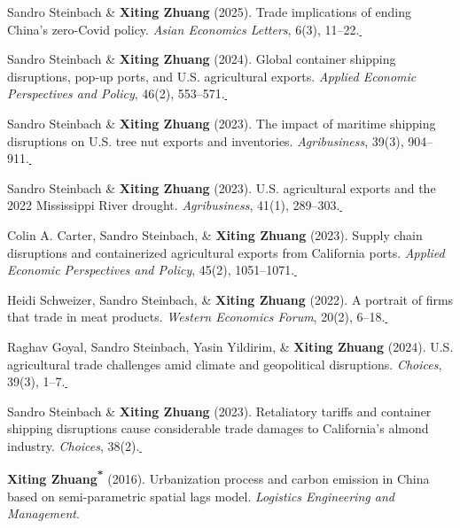 \documentclass[10.5pt,letterpaper]{article}
\newcommand{\corrauthor}{\textsuperscript{*}}
\newcommand{\paperlink}[1]{\href{#1}{\,\small\faExternalLink}}
\renewenvironment{itemize}{
	\begin{list}{}{
			\setlength{\leftmargin}{1.5em}
		}
	}{
	\end{list}
}
\begin{document}
\begin{itemize}
		\item[-] Sandro Steinbach \& \textbf{Xiting Zhuang} (2025). Trade implications of ending China's zero-Covid policy. \textit{Asian Economics Letters}, 6(3), 11--22.\paperlink{https://doi.org/10.46557/001c.137226}
		
		\item[-] Sandro Steinbach \& \textbf{Xiting Zhuang} (2024). Global container shipping disruptions, pop-up ports, and U.S. agricultural exports. \textit{Applied Economic Perspectives and Policy}, 46(2), 553--571.\paperlink{https://doi.org/10.1002/aepp.13399}
		
		\item[-] Sandro Steinbach \& \textbf{Xiting Zhuang} (2023). The impact of maritime shipping disruptions on U.S. tree nut exports and inventories. \textit{Agribusiness}, 39(3), 904--911.\paperlink{https://doi.org/10.1002/agr.21809}
		
		\item[-] Sandro Steinbach \& \textbf{Xiting Zhuang} (2023). U.S. agricultural exports and the 2022 Mississippi River drought. \textit{Agribusiness}, 41(1), 289--303.\paperlink{https://doi.org/10.1002/agr.21880}
		
		\item[-] Colin A. Carter, Sandro Steinbach, \& \textbf{Xiting Zhuang} (2023). Supply chain disruptions and containerized agricultural exports from California ports. \textit{Applied Economic Perspectives and Policy}, 45(2), 1051--1071.\paperlink{https://doi.org/10.1002/aepp.13311}
		
		\item[-] Heidi Schweizer, Sandro Steinbach, \& \textbf{Xiting Zhuang} (2022). A portrait of firms that trade in meat products. \textit{Western Economics Forum}, 20(2), 6--18.\paperlink{https://doi.org/10.22004/ag.econ.329728}
		
		\item[-] Raghav Goyal, Sandro Steinbach, Yasin Yildirim, \& \textbf{Xiting Zhuang} (2024). U.S. agricultural trade challenges amid climate and geopolitical disruptions. \textit{Choices}, 39(3), 1--7.\paperlink{https://www.choicesmagazine.org/choices-magazine/submitted-articles/us-agricultural-trade-challenges-amid-climate-and-geopolitical-disruptions}
		
		\item[-] Sandro Steinbach \& \textbf{Xiting Zhuang} (2023). Retaliatory tariffs and container shipping disruptions cause considerable trade damages to California's almond industry. \textit{Choices}, 38(2).\paperlink{https://www.choicesmagazine.org/choices-magazine/submitted-articles/retaliatory-tariffs-and-container-shipping-disruptions-cause-considerable-trade-damages-to-californias-almond-industry}
		
		\item[-] \textbf{Xiting Zhuang\corrauthor} (2016). Urbanization process and carbon emission in China based on semi-parametric spatial lags model. \textit{Logistics Engineering and Management}.
	\end{itemize}
	
\end{document}
